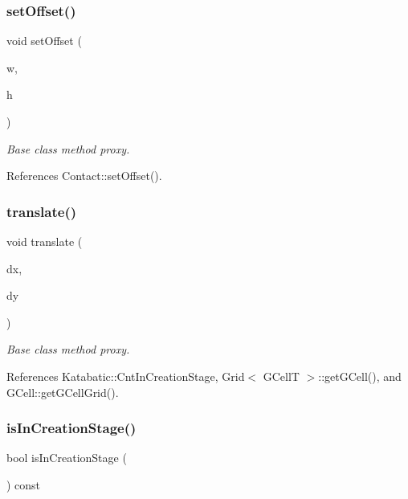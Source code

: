 \subsubsection{\texorpdfstring{set\+Offset()}{setOffset()}}
{\footnotesize\ttfamily void set\+Offset (\begin{DoxyParamCaption}\item[{\textbf{ Db\+U\+::\+Unit}}]{w,  }\item[{\textbf{ Db\+U\+::\+Unit}}]{h }\end{DoxyParamCaption})\hspace{0.3cm}{\ttfamily [inline]}}

{\itshape Base class method proxy.} 

References Contact\+::set\+Offset().

\mbox{\label{classKatabatic_1_1AutoContact_a9161f1e2832e5e141a13863223322aa5}} 
\subsubsection{\texorpdfstring{translate()}{translate()}}
{\footnotesize\ttfamily void translate (\begin{DoxyParamCaption}\item[{const \textbf{ Db\+U\+::\+Unit} \&}]{dx,  }\item[{const \textbf{ Db\+U\+::\+Unit} \&}]{dy }\end{DoxyParamCaption})\hspace{0.3cm}{\ttfamily [virtual]}}

{\itshape Base class method proxy.} 

References Katabatic\+::\+Cnt\+In\+Creation\+Stage, Grid$<$ G\+Cell\+T $>$\+::get\+G\+Cell(), and G\+Cell\+::get\+G\+Cell\+Grid().

\mbox{\label{classKatabatic_1_1AutoContact_a77e5036ce0c3628f5bf65e729ba875ba}} 
\subsubsection{\texorpdfstring{is\+In\+Creation\+Stage()}{isInCreationStage()}}
{\footnotesize\ttfamily bool is\+In\+Creation\+Stage (\begin{DoxyParamCaption}{ }\end{DoxyParamCaption}) const\hspace{0.3cm}{\ttfamily [inline]}}

